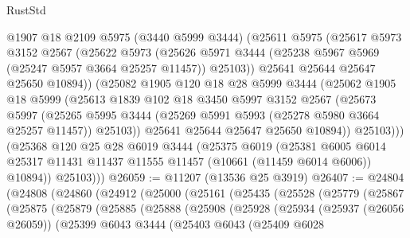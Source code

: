\begin{lexlean}{RustStd}
\begin{coremodule}
            @1907
            @18
            @2109
            @5975
            (@3440 @5999 @3444)
            (@25611
              @5975
              (@25617
                @5973
                @3152
                @2567
                (@25622
                  @5973
                  (@25626
                    @5971
                    @3444
                    (@25238 @5967 @5969 (@25247 @5957 @3664 @25257 @11457))
                    @25103))
                @25641
                @25644
                @25647
                @25650
                @10894))
            (@25082
              @1905
              @120
              @18
              @28
              @5999
              @3444
              (@25062
                @1905
                @18
                @5999
                (@25613
                  @1839
                  @102
                  @18
                  @3450
                  @5997
                  @3152
                  @2567
                  (@25673
                    @5997
                    (@25265
                      @5995
                      @3444
                      (@25269 @5991 @5993 (@25278 @5980 @3664 @25257 @11457))
                      @25103))
                  @25641
                  @25644
                  @25647
                  @25650
                  @10894))
              @25103)))
        (@25368
          @120
          @25
          @28
          @6019
          @3444
          (@25375
            @6019
            (@25381
              @6005
              @6014
              @25317
              @11431
              @11437
              @11555
              @11457
              (@10661 (@11459 @6014 @6006))
              @10894))
          @25103)))
@26059 := @11207 (@13536 @25 @3919)
@26407 := @24804
    (@24808
      (@24860
        (@24912
          (@25000
            (@25161
              (@25435
                (@25528
                  (@25779
                    (@25867
                      (@25875
                        (@25879
                          (@25885
                            (@25888
                              (@25908
                                (@25928
                                  (@25934
                                    (@25937 (@26056 @26059))
                                    (@25399
                                      @6043
                                      @3444
                                      (@25403
                                        @6043
                                        (@25409
                                          @6028

\end{coremodule}
\end{lexlean}
